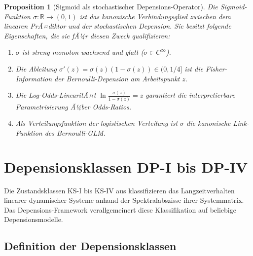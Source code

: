 ﻿\documentclass[12pt, a4paper]{article}
\newtheorem{proposition}[theorem]{Proposition}
\theoremstyle{definition}
\theoremstyle{remark}
\newcommand{\R}{\mathbb{R}}
\newcommand{\sigmoid}{\sigma}
\begin{document}
\begin{proposition}[Sigmoid als stochastischer Depensions-Operator]
\label{prop:sigmoid}
Die Sigmoid-Funktion $\sigmoid: \R \to (0,1)$ ist das kanonische Verbindungsglied
zwischen dem linearen PrÃ¤diktor und der stochastischen Depension. Sie besitzt
folgende Eigenschaften, die sie fÃ¼r diesen Zweck qualifizieren:
\begin{enumerate}[label=(\roman*)]
  \item $\sigmoid$ ist streng monoton wachsend und glatt ($\sigmoid \in C^\infty$).
  \item Die Ableitung $\sigmoid'(z) = \sigmoid(z)(1-\sigmoid(z)) \in (0, 1/4]$
    ist die Fisher-Information der Bernoulli-Depension am Arbeitspunkt $z$.
  \item Die Log-Odds-LinearitÃ¤t $\ln\frac{\sigmoid(z)}{1-\sigmoid(z)} = z$ garantiert
    die interpretierbare Parametrisierung Ã¼ber Odds-Ratios.
  \item Als Verteilungsfunktion der logistischen Verteilung ist $\sigmoid$ die
    kanonische Link-Funktion des Bernoulli-GLM.
\end{enumerate}
\end{proposition}

\section{Depensionsklassen DP-I bis DP-IV}
\label{sec:klassen}

Die Zustandsklassen KS-I bis KS-IV aus \citet{epp2026sysstate} klassifizieren das
Langzeitverhalten linearer dynamischer Systeme anhand der Spektralabszisse ihrer
Systemmatrix. Das Depensions-Framework verallgemeinert diese Klassifikation auf
beliebige Depensionsmodelle.

\subsection{Definition der Depensionsklassen}
\end{document}
